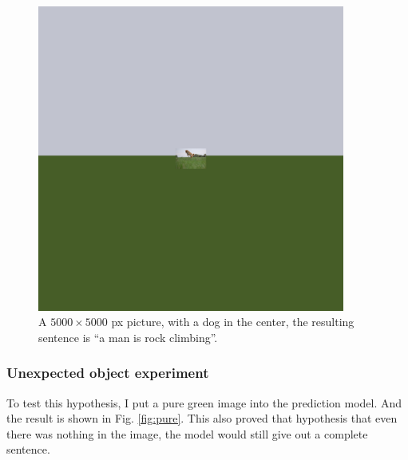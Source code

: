 \documentclass[10pt,twocolumn,letterpaper]{article}
\begin{document}
\begin{itemize}
\begin{figure}
    \begin{center}
        \includegraphics[width=0.9\textwidth]{2584487952_f70e5aa9bf.jpg}
    \end{center}
    \caption{A $5000 \times 5000$ px picture, with a dog in the center, the resulting sentence is ``a man is rock climbing''.}
    \label{fig:hs}
\end{figure}

\subsubsection{Unexpected object experiment} \label{sec:uo}
To test this hypothesis, I put a pure green image into the prediction model.
And the result is shown in Fig. \ref{fig:pure}.
This also proved that hypothesis that even there was nothing in the image, the model would still give out a complete sentence.


\end{itemize}
\end{document}
